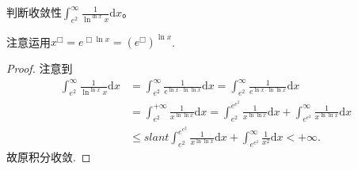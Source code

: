 \documentclass[../../main.tex]{subfiles}
\begin{document}
\begin{example}
判断收敛性\(\int_{e^2}^{\infty}\frac{1}{\ln^{\ln x}x}\mathrm{d}x\)。 
\end{example}
\begin{note}
注意运用\(x^{\Box}=e^{\Box\ln x}=(e^{\Box})^{\ln x}\).
\end{note}
\begin{proof}
注意到
\begin{align*}
\int_{e^2}^{\infty}\frac{1}{\ln^{\ln x}x}\mathrm{d}x&=\int_{e^2}^{\infty}\frac{1}{e^{\ln x\cdot \ln\ln x}}\mathrm{d}x=\int_{e^2}^{\infty}\frac{1}{e^{\ln x\cdot \ln\ln x}}\mathrm{d}x\\
&=\int_{e^2}^{+\infty}\frac{1}{x^{\ln\ln x}}\mathrm{d}x=\int_{e^2}^{e^{e^2}}\frac{1}{x^{\ln\ln x}}\mathrm{d}x+\int_{e^{e^2}}^{\infty}\frac{1}{x^{\ln\ln x}}\mathrm{d}x\\
&\leqslant slant \int_{e^2}^{e^{e^2}}\frac{1}{x^{\ln\ln x}}\mathrm{d}x+\int_{e^{e^2}}^{\infty}\frac{1}{x^2}\mathrm{d}x<+\infty.
\end{align*}
故原积分收敛. 
\end{proof}
\end{document}
